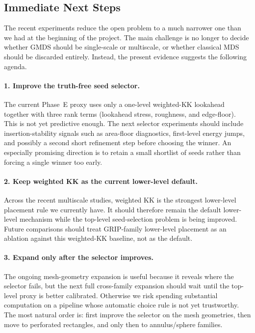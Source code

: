 \documentclass[twoside,11pt]{article}
\begin{document}
\subsection{Immediate Next Steps}
\label{sec:next_steps}

The recent experiments reduce the open problem to a much narrower one than we
had at the beginning of the project.  The main challenge is no longer to
decide whether GMDS should be single-scale or multiscale, or whether classical
MDS should be discarded entirely.  Instead, the present evidence suggests the
following agenda.

\paragraph{1. Improve the truth-free seed selector.}
The current Phase~E proxy uses only a one-level weighted-KK lookahead together
with three rank terms (lookahead stress, roughness, and edge-floor).  This is
not yet predictive enough.  The next selector experiments should include
insertion-stability signals such as area-floor diagnostics, first-level energy
jumps, and possibly a second short refinement step before choosing the winner.
An especially promising direction is to retain a small shortlist of seeds
rather than forcing a single winner too early.

\paragraph{2. Keep weighted KK as the current lower-level default.}
Across the recent multiscale studies, weighted KK is the strongest lower-level
placement rule we currently have.  It should therefore remain the default
lower-level mechanism while the top-level seed-selection problem is being
improved.  Future comparisons should treat GRIP-family lower-level placement as
an ablation against this weighted-KK baseline, not as the default.

\paragraph{3. Expand only after the selector improves.}
The ongoing mesh-geometry expansion is useful because it reveals where the
selector fails, but the next full cross-family expansion should wait until the
top-level proxy is better calibrated.  Otherwise we risk spending substantial
computation on a pipeline whose automatic choice rule is not yet trustworthy.
The most natural order is: first improve the selector on the mesh geometries,
then move to perforated rectangles, and only then to annulus/sphere families.
\end{document}
